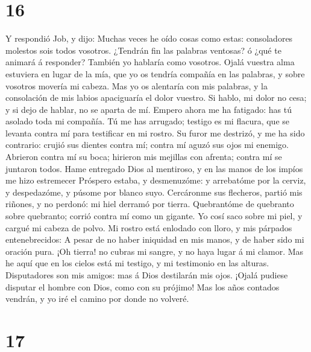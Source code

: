 \hypertarget{section-15}{%
\section{16}\label{section-15}}

 Y respondió Job, y dijo:  Muchas veces he oído
cosas como estas: consoladores molestos sois todos vosotros.
 ¿Tendrán fin las palabras ventosas? ó ¿qué te animará á
responder?  También yo hablaría como vosotros. Ojalá vuestra
alma estuviera en lugar de la mía, que yo os tendría compañía en las
palabras, y sobre vosotros movería mi cabeza.  Mas yo os
alentaría con mis palabras, y la consolación de mis labios apaciguaría
el dolor vuestro.  Si hablo, mi dolor no cesa; y si dejo de
hablar, no se aparta de mí.  Empero ahora me ha fatigado:
has tú asolado toda mi compañía.  Tú me has arrugado;
testigo es mi flacura, que se levanta contra mí para testificar en mi
rostro.  Su furor me destrizó, y me ha sido contrario:
crujió sus dientes contra mí; contra mí aguzó sus ojos mi enemigo.
 Abrieron contra mí su boca; hirieron mis mejillas con
afrenta; contra mí se juntaron todos.  Hame entregado Dios
al mentiroso, y en las manos de los impíos me hizo estremecer
 Próspero estaba, y desmenuzóme: y arrebatóme por la
cerviz, y despedazóme, y púsome por blanco suyo. 
Cercáronme sus flecheros, partió mis riñones, y no perdonó: mi hiel
derramó por tierra.  Quebrantóme de quebranto sobre
quebranto; corrió contra mí como un gigante.  Yo cosí saco
sobre mi piel, y cargué mi cabeza de polvo.  Mi rostro está
enlodado con lloro, y mis párpados entenebrecidos:  A pesar
de no haber iniquidad en mis manos, y de haber sido mi oración pura.
 ¡Oh tierra! no cubras mi sangre, y no haya lugar á mi
clamor.  Mas he aquí que en los cielos está mi testigo, y
mi testimonio en las alturas.  Disputadores son mis amigos:
mas á Dios destilarán mis ojos.  ¡Ojalá pudiese disputar el
hombre con Dios, como con su prójimo!  Mas los años
contados vendrán, y yo iré el camino por donde no volveré.

\hypertarget{section-16}{%
\section{17}\label{section-16}}

